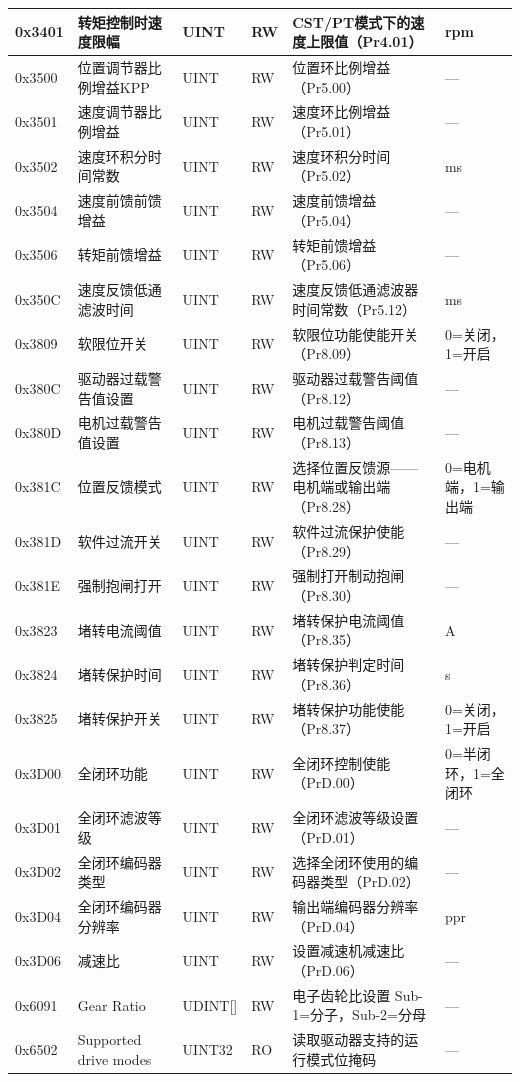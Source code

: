 \documentclass[12pt,a4paper,landscape]{article}
\begin{document}
\begin{longtable}{|C{1.8cm}|L{3.5cm}|C{1.2cm}|C{1cm}|L{6cm}|L{3cm}|}
\hline
0x3401 & 转矩控制时速度限幅 & UINT & RW & CST/PT模式下的速度上限值（Pr4.01） & rpm \\
\hline
0x3500 & 位置调节器比例增益KPP & UINT & RW & 位置环比例增益（Pr5.00） & — \\
\hline
0x3501 & 速度调节器比例增益 & UINT & RW & 速度环比例增益（Pr5.01） & — \\
\hline
0x3502 & 速度环积分时间常数 & UINT & RW & 速度环积分时间（Pr5.02） & ms \\
\hline
0x3504 & 速度前馈前馈增益 & UINT & RW & 速度前馈增益（Pr5.04） & — \\
\hline
0x3506 & 转矩前馈增益 & UINT & RW & 转矩前馈增益（Pr5.06） & — \\
\hline
0x350C & 速度反馈低通滤波时间 & UINT & RW & 速度反馈低通滤波器时间常数（Pr5.12） & ms \\
\hline
0x3809 & 软限位开关 & UINT & RW & 软限位功能使能开关（Pr8.09） & 0=关闭，1=开启 \\
\hline
0x380C & 驱动器过载警告值设置 & UINT & RW & 驱动器过载警告阈值（Pr8.12） & — \\
\hline
0x380D & 电机过载警告值设置 & UINT & RW & 电机过载警告阈值（Pr8.13） & — \\
\hline
0x381C & 位置反馈模式 & UINT & RW & 选择位置反馈源——电机端或输出端（Pr8.28） & 0=电机端，1=输出端 \\
\hline
0x381D & 软件过流开关 & UINT & RW & 软件过流保护使能（Pr8.29） & — \\
\hline
0x381E & 强制抱闸打开 & UINT & RW & 强制打开制动抱闸（Pr8.30） & — \\
\hline
0x3823 & 堵转电流阈值 & UINT & RW & 堵转保护电流阈值（Pr8.35） & A \\
\hline
0x3824 & 堵转保护时间 & UINT & RW & 堵转保护判定时间（Pr8.36） & s \\
\hline
0x3825 & 堵转保护开关 & UINT & RW & 堵转保护功能使能（Pr8.37） & 0=关闭，1=开启 \\
\hline
0x3D00 & 全闭环功能 & UINT & RW & 全闭环控制使能（PrD.00） & 0=半闭环，1=全闭环 \\
\hline
0x3D01 & 全闭环滤波等级 & UINT & RW & 全闭环滤波等级设置（PrD.01） & — \\
\hline
0x3D02 & 全闭环编码器类型 & UINT & RW & 选择全闭环使用的编码器类型（PrD.02） & — \\
\hline
0x3D04 & 全闭环编码器分辨率 & UINT & RW & 输出端编码器分辨率（PrD.04） & ppr \\
\hline
0x3D06 & 减速比 & UINT & RW & 设置减速机减速比（PrD.06） & — \\
\hline
0x6091 & Gear Ratio & UDINT[] & RW & 电子齿轮比设置 Sub-1=分子，Sub-2=分母 & — \\
\hline
0x6502 & Supported drive modes & UINT32 & RO & 读取驱动器支持的运行模式位掩码 & — \\
\hline
\end{longtable}
\end{document}
